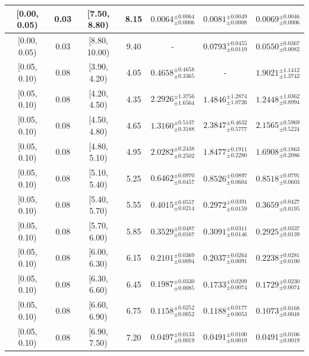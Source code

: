 \begin{longtable}{|c|c|c|c|c|c|c|}
\hline
[0.00, 0.05) & 0.03 & [7.50, 8.80) & 8.15 & $0.0064^{ \pm 0.0064 }_{ \pm 0.0006 }$ & $0.0081^{ \pm 0.0049 }_{ \pm 0.0008 }$ & $0.0069^{ \pm 0.0046 }_{ \pm 0.0006 }$ \\ 
\hline
[0.00, 0.05) & 0.03 & [8.80, 10.00) & 9.40 & - & $0.0793^{ \pm 0.0455 }_{ \pm 0.0119 }$ & $0.0550^{ \pm 0.0367 }_{ \pm 0.0082 }$ \\ 
\hline
[0.05, 0.10) & 0.08 & [3.90, 4.20) & 4.05 & $0.4658^{ \pm 0.4658 }_{ \pm 0.3365 }$ & - & $1.9021^{ \pm 1.1412 }_{ \pm 1.3742 }$ \\ 
\hline
[0.05, 0.10) & 0.08 & [4.20, 4.50) & 4.35 & $2.2926^{ \pm 1.3756 }_{ \pm 1.6564 }$ & $1.4846^{ \pm 1.2874 }_{ \pm 1.0726 }$ & $1.2448^{ \pm 1.0362 }_{ \pm 0.8994 }$ \\ 
\hline
[0.05, 0.10) & 0.08 & [4.50, 4.80) & 4.65 & $1.3160^{ \pm 0.5137 }_{ \pm 0.3188 }$ & $2.3847^{ \pm 0.4632 }_{ \pm 0.5777 }$ & $2.1565^{ \pm 0.5969 }_{ \pm 0.5224 }$ \\ 
\hline
[0.05, 0.10) & 0.08 & [4.80, 5.10) & 4.95 & $2.0282^{ \pm 0.2438 }_{ \pm 0.2502 }$ & $1.8477^{ \pm 0.1911 }_{ \pm 0.2280 }$ & $1.6908^{ \pm 0.1863 }_{ \pm 0.2086 }$ \\ 
\hline
[0.05, 0.10) & 0.08 & [5.10, 5.40) & 5.25 & $0.6462^{ \pm 0.0970 }_{ \pm 0.0457 }$ & $0.8526^{ \pm 0.0897 }_{ \pm 0.0604 }$ & $0.8518^{ \pm 0.0791 }_{ \pm 0.0603 }$ \\ 
\hline
[0.05, 0.10) & 0.08 & [5.40, 5.70) & 5.55 & $0.4015^{ \pm 0.0557 }_{ \pm 0.0214 }$ & $0.2972^{ \pm 0.0391 }_{ \pm 0.0159 }$ & $0.3659^{ \pm 0.0427 }_{ \pm 0.0195 }$ \\ 
\hline
[0.05, 0.10) & 0.08 & [5.70, 6.00) & 5.85 & $0.3529^{ \pm 0.0487 }_{ \pm 0.0167 }$ & $0.3091^{ \pm 0.0311 }_{ \pm 0.0146 }$ & $0.2925^{ \pm 0.0337 }_{ \pm 0.0139 }$ \\ 
\hline
[0.05, 0.10) & 0.08 & [6.00, 6.30) & 6.15 & $0.2101^{ \pm 0.0369 }_{ \pm 0.0094 }$ & $0.2037^{ \pm 0.0264 }_{ \pm 0.0091 }$ & $0.2238^{ \pm 0.0281 }_{ \pm 0.0100 }$ \\ 
\hline
[0.05, 0.10) & 0.08 & [6.30, 6.60) & 6.45 & $0.1987^{ \pm 0.0330 }_{ \pm 0.0085 }$ & $0.1733^{ \pm 0.0209 }_{ \pm 0.0074 }$ & $0.1729^{ \pm 0.0230 }_{ \pm 0.0074 }$ \\ 
\hline
[0.05, 0.10) & 0.08 & [6.60, 6.90) & 6.75 & $0.1158^{ \pm 0.0252 }_{ \pm 0.0052 }$ & $0.1188^{ \pm 0.0177 }_{ \pm 0.0053 }$ & $0.1073^{ \pm 0.0168 }_{ \pm 0.0048 }$ \\ 
\hline
[0.05, 0.10) & 0.08 & [6.90, 7.50) & 7.20 & $0.0497^{ \pm 0.0133 }_{ \pm 0.0019 }$ & $0.0491^{ \pm 0.0100 }_{ \pm 0.0019 }$ & $0.0491^{ \pm 0.0106 }_{ \pm 0.0019 }$ \\ 

\end{longtable}
